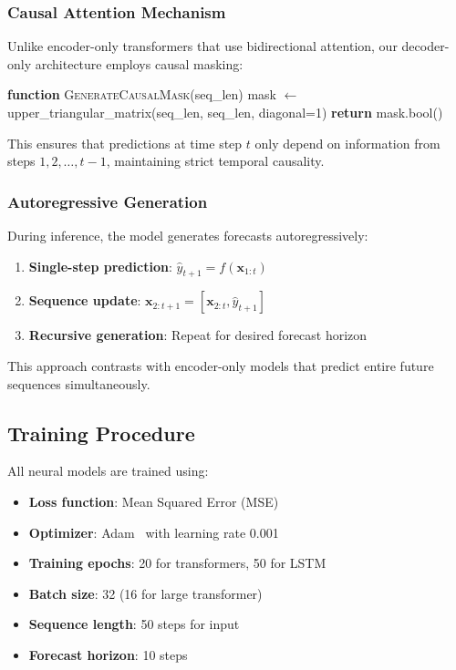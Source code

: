\documentclass[11pt]{article}
\begin{document}
\subsubsection{Causal Attention Mechanism}

Unlike encoder-only transformers that use bidirectional attention, our decoder-only architecture employs causal masking:

\begin{algorithmic}
\STATE \textbf{function} \textsc{GenerateCausalMask}(seq\_len)
\STATE mask $\leftarrow$ upper\_triangular\_matrix(seq\_len, seq\_len, diagonal=1)
\STATE \textbf{return} mask.bool()
\end{algorithmic}

This ensures that predictions at time step $t$ only depend on information from steps $1, 2, \ldots, t-1$, maintaining strict temporal causality.

\subsubsection{Autoregressive Generation}

During inference, the model generates forecasts autoregressively:
\begin{enumerate}
\item \textbf{Single-step prediction}: $\hat{y}_{t+1} = f(\mathbf{x}_{1:t})$
\item \textbf{Sequence update}: $\mathbf{x}_{2:t+1} = [\mathbf{x}_{2:t}, \hat{y}_{t+1}]$
\item \textbf{Recursive generation}: Repeat for desired forecast horizon
\end{enumerate}

This approach contrasts with encoder-only models that predict entire future sequences simultaneously.

\subsection{Training Procedure}

All neural models are trained using:
\begin{itemize}
\item \textbf{Loss function}: Mean Squared Error (MSE)
\item \textbf{Optimizer}: Adam~\cite{kingma2014adam} with learning rate 0.001
\item \textbf{Training epochs}: 20 for transformers, 50 for LSTM
\item \textbf{Batch size}: 32 (16 for large transformer)
\item \textbf{Sequence length}: 50 steps for input
\item \textbf{Forecast horizon}: 10 steps
\end{itemize}
\end{document}
